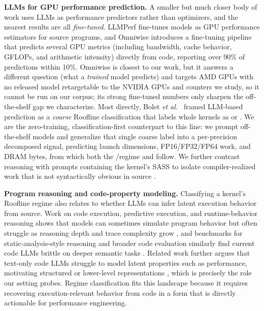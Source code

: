 \noindent\textbf{LLMs for GPU performance prediction.}
A smaller but much closer body of work uses LLMs as performance predictors rather than optimizers, and the nearest results are all \emph{fine-tuned}.
LLMPerf \cite{nguyen-nhatLLMPerfGPUPerformance2024} fine-tunes models as GPU performance estimators for source programs, and Omniwise \cite{wangOmniwisePredictingGPU2025} introduces a fine-tuning pipeline that predicts several GPU metrics (including bandwidth, cache behavior, GFLOPs, and arithmetic intensity) directly from code, reporting over 90\% of predictions within 10\%.
Omniwise is closest to our work, but it answers a different question (what a \emph{trained} model predicts) and targets AMD GPUs with no released model retargetable to the NVIDIA GPUs and counters we study, so it cannot be run on our corpus; its strong fine-tuned numbers only sharpen the off-the-shelf gap we characterize.
Most directly, Bolet \textit{et al.}~\cite{boletCanLargeLanguage2025} framed LLM-based prediction as a \emph{coarse} Roofline classification that labels whole kernels as \computebound or \bandwidthbound.
We are the zero-training, classification-first counterpart to this line: we prompt off-the-shelf models and generalize that single coarse label into a per-precision decomposed signal, predicting launch dimensions, FP16/FP32/FP64 work, and DRAM bytes, from which both the \bandwidthbound/\computebound regime and \rai follow.
We further contrast \sourceonly reasoning with prompts containing the kernel's SASS to isolate compiler-realized work that is not syntactically obvious in source \cite{alfredCompilersPrinciplesTechniques2007,IEEEStandardFloatingPoint2019,louvetNewtonRaphsonAlgorithmsFloatingpoint2010}.






\noindent\textbf{Program reasoning and code-property modeling.}
Classifying a kernel's Roofline regime also relates to whether LLMs can infer latent execution behavior from source.
Work on code execution, predictive execution, and runtime-behavior reasoning shows that models can sometimes simulate program behavior but often struggle as reasoning depth and trace complexity grow \cite{liuCodeExecutionPretrained2023,lyuLargeLanguageModels2024,liBlendedAnalysisPredictive2025,chenReasoningRuntimeBehavior2025}, and benchmarks for static-analysis-style reasoning and broader code evaluation similarly find current code LLMs brittle on deeper semantic tasks \cite{xieCOREBenchmarkingLLMs2025,jainLiveCodeBenchHolisticContamination2024}.
Related work further argues that text-only code LLMs struggle to model latent properties such as performance, motivating structured or lower-level representations \cite{pydaShortcomingsCodeLLMs2025}, which is precisely the role our \sourcesass setting probes.
Regime classification fits this landscape because it requires recovering execution-relevant behavior from code in a form that is directly actionable for performance engineering.
    





